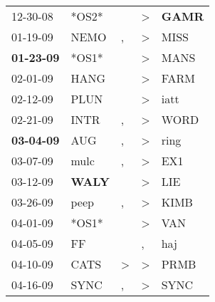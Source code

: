 \begin{supertabular}{p{0.07\textwidth}p{0.06\textwidth}p{0.02\textwidth}p{0.02\textwidth}p{0.06\textwidth}}
          12-30-08\textsuperscript{} &                            *OS2* &                  &     \textgreater &  \textbf{GAMR\textsuperscript{}} \\
          01-19-09\textsuperscript{} &           NEMO\textsuperscript{} &                , &     \textgreater &           MISS\textsuperscript{} \\
 \textbf{01-23-09\textsuperscript{}} &                            *OS1* &                  &     \textgreater &           MANS\textsuperscript{} \\
          02-01-09\textsuperscript{} &           HANG\textsuperscript{} &                  &     \textgreater &           FARM\textsuperscript{} \\
          02-12-09\textsuperscript{} &           PLUN\textsuperscript{} &                  &     \textgreater &           iatt\textsuperscript{} \\
          02-21-09\textsuperscript{} &           INTR\textsuperscript{} &                , &     \textgreater &           WORD\textsuperscript{} \\
 \textbf{03-04-09\textsuperscript{}} &            AUG\textsuperscript{} &                , &     \textgreater &           ring\textsuperscript{} \\
          03-07-09\textsuperscript{} &           mulc\textsuperscript{} &                , &     \textgreater &            EX1\textsuperscript{} \\
          03-12-09\textsuperscript{} &  \textbf{WALY\textsuperscript{}} &                  &     \textgreater &            LIE\textsuperscript{} \\
          03-26-09\textsuperscript{} &           peep\textsuperscript{} &                , &     \textgreater &           KIMB\textsuperscript{} \\
          04-01-09\textsuperscript{} &                            *OS1* &                  &     \textgreater &            VAN\textsuperscript{} \\
          04-05-09\textsuperscript{} &             FF\textsuperscript{} &                  &                , &            haj\textsuperscript{} \\
          04-10-09\textsuperscript{} &           CATS\textsuperscript{} &     \textgreater &     \textgreater &           PRMB\textsuperscript{} \\
          04-16-09\textsuperscript{} &           SYNC\textsuperscript{} &                , &     \textgreater &           SYNC\textsuperscript{} \\

\end{supertabular}
